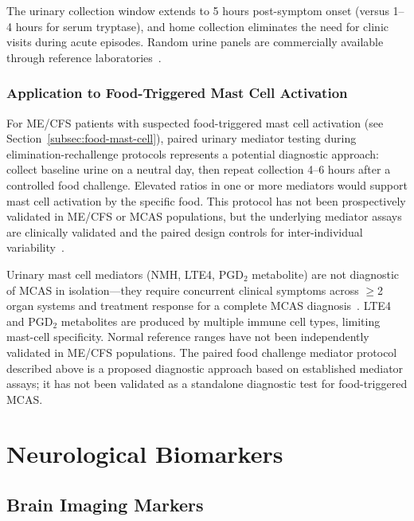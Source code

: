 The urinary collection window extends to 5 hours post-symptom onset (versus 1--4 hours for serum tryptase), and home collection eliminates the need for clinic visits during acute episodes. Random urine panels are commercially available through reference laboratories~\cite{Voelker2024urinemast}.

\subsubsection{Application to Food-Triggered Mast Cell Activation}

For ME/CFS patients with suspected food-triggered mast cell activation (see Section~\ref{subsec:food-mast-cell}), paired urinary mediator testing during elimination-rechallenge protocols represents a potential diagnostic approach: collect baseline urine on a neutral day, then repeat collection 4--6 hours after a controlled food challenge. Elevated ratios in one or more mediators would support mast cell activation by the specific food. This protocol has not been prospectively validated in ME/CFS or MCAS populations, but the underlying mediator assays are clinically validated and the paired design controls for inter-individual variability~\cite{Voelker2025biomarkersmast}.

\begin{limitation}
\label{lim:mast-cell-biomarkers}
Urinary mast cell mediators (NMH, LTE4, PGD$_2$ metabolite) are not diagnostic of MCAS in isolation---they require concurrent clinical symptoms across $\geq$2 organ systems and treatment response for a complete MCAS diagnosis~\cite{Gulen2024mcascriteria,Castells2024mcasreview}. LTE4 and PGD$_2$ metabolites are produced by multiple immune cell types, limiting mast-cell specificity. Normal reference ranges have not been independently validated in ME/CFS populations. The paired food challenge mediator protocol described above is a proposed diagnostic approach based on established mediator assays; it has not been validated as a standalone diagnostic test for food-triggered MCAS.
\end{limitation}

\section{Neurological Biomarkers}
\label{sec:neurological-biomarkers}

\subsection{Brain Imaging Markers}

